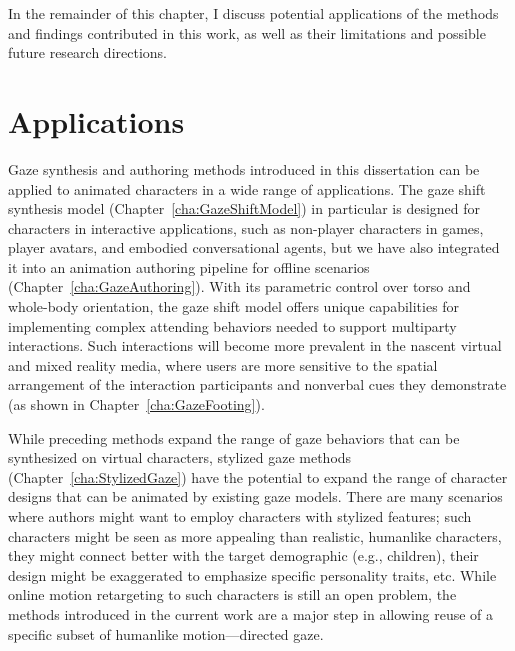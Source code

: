 In the remainder of this chapter, I discuss potential applications of the methods and findings contributed in this work, as well as their limitations and possible future research directions.

\section{Applications}

Gaze synthesis and authoring methods introduced in this dissertation can be applied to animated characters in a wide range of applications. The gaze shift synthesis model (Chapter~\ref{cha:GazeShiftModel}) in particular is designed for characters in interactive applications, such as non-player characters in games, player avatars, and embodied conversational agents, but we have also integrated it into an animation authoring pipeline for offline scenarios (Chapter~\ref{cha:GazeAuthoring}).
With its parametric control over torso and whole-body orientation, the gaze shift model offers unique capabilities for implementing complex attending behaviors needed to support multiparty interactions. Such interactions will become more prevalent in the nascent virtual and mixed reality media, where users are more sensitive to the spatial arrangement of the interaction participants and nonverbal cues they demonstrate (as shown in Chapter~\ref{cha:GazeFooting}).

While preceding methods expand the range of gaze behaviors that can be synthesized on virtual characters, stylized gaze methods (Chapter~\ref{cha:StylizedGaze}) have the potential to expand the range of character designs that can be animated by existing gaze models. There are many scenarios where authors might want to employ characters with stylized features; such characters might be seen as more appealing than realistic, humanlike characters, they might connect better with the target demographic (e.g., children), their design might be exaggerated to emphasize specific personality traits, etc. While online motion retargeting to such characters is still an open problem, the methods introduced in the current work are a major step in allowing reuse of a specific subset of humanlike motion---directed gaze.

